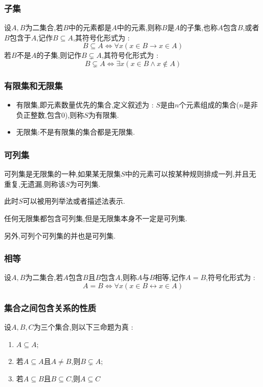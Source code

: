 \documentclass[UTF8,12pt]{ctexbook}
\begin{document}
{{{{\subsubsection{子集}{
  设$A,B$为二集合,若$B$中的元素都是$A$中的元素,则称$B$是$A$的子集,也称$A$包含$B$,或者$B$包含于$A$,记作$B \subseteq A$,其符号化形式为 : $$
    B \subseteq A \Leftrightarrow \forall x (x \in B \to x \in A)
  $$
  若$B$不是$A$的子集,则记作$B \subsetneq A$,其符号化形式为 : $$
    B \subsetneq A \Leftrightarrow \exists x (x \in B \land x \notin A)
  $$
}%

\subsubsection{有限集和无限集}{
  \begin{itemize}
    \item 有限集,即元素数量优先的集合,定义叙述为 : $S$是由$n$个元素组成的集合($n$是非负正整数,包含0),则称$S$为有限集.
    \item 无限集:不是有限集的集合都是无限集.
  \end{itemize}
}%

\subsubsection{可列集}{
  可列集是无限集的一种,如果某无限集$S$中的元素可以按某种规则排成一列,并且无重复,无遗漏,则称该$S$为可列集.

  此时$S$可以被用列举法或者描述法表示.

  任何无限集都包含可列集,但是无限集本身不一定是可列集.

  另外,可列个可列集的并也是可列集.

}%

\subsubsection{相等}{
  设$A,B$为二集合,若$A$包含$B$且$B$包含$A$,则称$A$与$B$相等,记作$A = B$,符号化形式为 : $$
    A = B \Leftrightarrow \forall x (x \in B \longleftrightarrow x \in A)
  $$
}%

\subsubsection{集合之间包含关系的性质}{
  设$A,B,C$为三个集合,则以下三命题为真 :

  \begin{enumerate}
    \item $A \subseteq A$;
    \item 若$A \subseteq A$且$A \neq B$,则$B \subsetneq A$;
    \item 若$A \subseteq B$且$B \subseteq C$,则$A \subseteq C$
  \end{enumerate}
}%

}}}}
\end{document}
